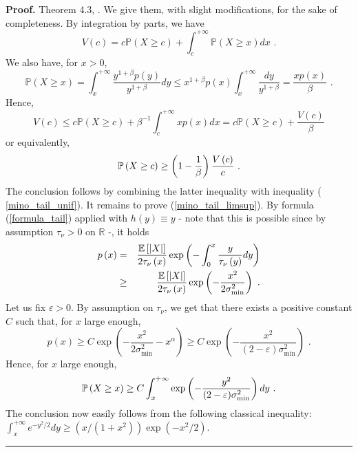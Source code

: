\documentclass[11pt]{article}
\newenvironment{proof}[1][Proof]{\noindent\textbf{#1.} }{\ \rule{0.5em}{0.5em}}
\begin{document}
\begin{proof}
Theorem 4.3, \cite{MR2556018}. We give them, with slight modifications, for
the sake of completeness. By integration by parts, we have%
\begin{equation*}
V\left( c\right) =c\mathbb{P}\left( X\geq c\right) +\int_{c}^{+\infty }%
\mathbb{P}\left( X\geq x\right) dx\text{ .}
\end{equation*}%
We also have, for $x>0$,%
\begin{equation*}
\mathbb{P}\left( X\geq x\right) =\int_{x}^{+\infty }\frac{y^{1+\beta
}p\left( y\right) }{y^{1+\beta }}dy\leq x^{1+\beta }p\left( x\right)
\int_{x}^{+\infty }\frac{dy}{y^{1+\beta }}=\frac{xp\left( x\right) }{\beta }%
\text{ .}
\end{equation*}%
Hence,%
\begin{equation*}
V\left( c\right) \leq c\mathbb{P}\left( X\geq c\right) +\beta
^{-1}\int_{c}^{+\infty }xp\left( x\right) dx=c\mathbb{P}\left( X\geq
c\right) +\frac{V\left( c\right) }{\beta }
\end{equation*}%
or equivalently,%
\begin{equation*}
\mathbb{P}\left( X\geq c\right) \geq \left( 1-\frac{1}{\beta }\right) \frac{%
V\left( c\right) }{c}\text{ .}
\end{equation*}%
The conclusion follows by combining the latter inequality with inequality (%
\ref{mino_tail_unif}). It remains to prove (\ref{mino_tail_limsup}). By
formula (\ref{formula_tail}) applied with $h\left( y\right) \equiv y$ - note
that this is possible since by assumption $\tau _{\nu }>0$ on $\mathbb{R}$
-, it holds%
\begin{eqnarray*}
p\left( x\right) &=&\frac{\mathbb{E}\left[ \left\vert X\right\vert \right] }{%
2\tau _{\nu }\left( x\right) }\exp \left( -\int_{0}^{x}\frac{y}{\tau _{\nu
}\left( y\right) }dy\right) \\
&\geq &\frac{\mathbb{E}\left[ \left\vert X\right\vert \right] }{2\tau _{\nu
}\left( x\right) }\exp \left( -\frac{x^{2}}{2\sigma _{\min }^{2}}\right) 
\text{ .}
\end{eqnarray*}%
Let us fix $\varepsilon >0$. By assumption on $\tau _{\nu }$, we get that
there exists a positive constant $C$ such that, for $x$ large enough, 
\begin{equation*}
p\left( x\right) \geq C\exp \left( -\frac{x^{2}}{2\sigma _{\min }^{2}}%
-x^{\alpha }\right) \geq C\exp \left( -\frac{x^{2}}{(2-\varepsilon )\sigma
_{\min }^{2}}\right) \text{ .}
\end{equation*}%
Hence, for $x$ large enough,%
\begin{equation*}
\mathbb{P}\left( X\geq x\right) \geq C\int_{x}^{+\infty }\exp \left( -\frac{%
y^{2}}{(2-\varepsilon )\sigma _{\min }^{2}}\right) dy\text{ .}
\end{equation*}%
The conclusion now easily follows from the following classical inequality: $%
\int_{x}^{+\infty }e^{-y^{2}/2}dy\geq (x/(1+x^{2}))\exp \left(
-x^{2}/2\right) $.
\end{proof}
\end{document}
